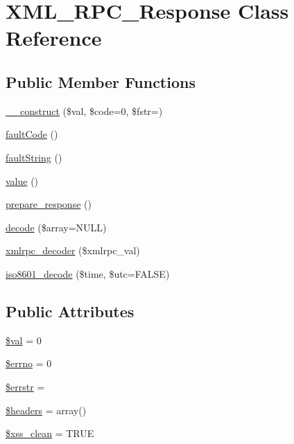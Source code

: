 \hypertarget{class_x_m_l___r_p_c___response}{}\section{X\+M\+L\+\_\+\+R\+P\+C\+\_\+\+Response Class Reference}
\label{class_x_m_l___r_p_c___response}
\subsection*{Public Member Functions}
\begin{DoxyCompactItemize}
\item 
\mbox{\hyperlink{class_x_m_l___r_p_c___response_a62cc1aaff0155564cfc1c280707a8f86}{\+\_\+\+\_\+construct}} (\$val, \$code=0, \$fstr=\textquotesingle{}\textquotesingle{})
\item 
\mbox{\hyperlink{class_x_m_l___r_p_c___response_ad6849a82f23db4d67e06a7fcaa94aec2}{fault\+Code}} ()
\item 
\mbox{\hyperlink{class_x_m_l___r_p_c___response_a2f922009ed0801616d3df198a48d193b}{fault\+String}} ()
\item 
\mbox{\hyperlink{class_x_m_l___r_p_c___response_aefbfa229f1c9e1fc967bff724a010f9e}{value}} ()
\item 
\mbox{\hyperlink{class_x_m_l___r_p_c___response_ac6925a06291928e6d4e8e53ea10fb1e2}{prepare\+\_\+response}} ()
\item 
\mbox{\hyperlink{class_x_m_l___r_p_c___response_a03c0253c215ae6aaafc6a949276b06bd}{decode}} (\$array=N\+U\+LL)
\item 
\mbox{\hyperlink{class_x_m_l___r_p_c___response_a44f453c58a4aad3ccb76dd9926f9fa64}{xmlrpc\+\_\+decoder}} (\$xmlrpc\+\_\+val)
\item 
\mbox{\hyperlink{class_x_m_l___r_p_c___response_afd1f70f703eb82303e1199e8653c9c44}{iso8601\+\_\+decode}} (\$time, \$utc=F\+A\+L\+SE)
\end{DoxyCompactItemize}
\subsection*{Public Attributes}
\begin{DoxyCompactItemize}
\item 
\mbox{\hyperlink{class_x_m_l___r_p_c___response_aac81a74a7b30767af29bfd9a695636df}{\$val}} = 0
\item 
\mbox{\hyperlink{class_x_m_l___r_p_c___response_a2be10a914e39a6b1f855ddf3b9a21367}{\$errno}} = 0
\item 
\mbox{\hyperlink{class_x_m_l___r_p_c___response_a126a4369646afcf007816bfa8c208d11}{\$errstr}} = \textquotesingle{}\textquotesingle{}
\item 
\mbox{\hyperlink{class_x_m_l___r_p_c___response_a52500036ee807241b8b4b7e2367c49ef}{\$headers}} = array()
\item 
\mbox{\hyperlink{class_x_m_l___r_p_c___response_a0f2ee8861c0b3164a5c6e126dd98c0cc}{\$xss\+\_\+clean}} = T\+R\+UE
\end{DoxyCompactItemize}


